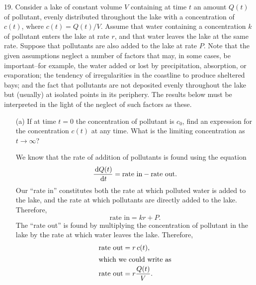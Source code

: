 \begin{ex}
  \item[19.]
    Consider a lake of constant volume $V$ containing at time $t$ an amount $Q(t)$ of pollutant,
    evenly distributed throughout the lake with a concentration of $c(t)$, where $c(t)=Q(t)/V$.
    Assume that water containing a concentration $k$ of pollutant enters the lake at rate $r$,
    and that water leaves the lake at the same rate.
    Suppose that pollutants are also added to the lake at rate $P$.
    Note that the given assumptions neglect a number of factors that may, in some cases, be important--for example,
    the water added or lost by precipitation, absorption, or evaporation;
    the tendency of irregularities in the coastline to produce sheltered bays;
    and the fact that pollutants are not deposited evenly throughout the lake but (usually) at isolated points in its periphery.
    The results below must be interpreted in the light of the neglect of such factors as these. \cite[p. 63]{boycede}
    \begin{enumerate}
      \item[(a)]
        If at time $t=0$ the concentration of pollutant is $c_0$, find an expression for the concentration $c(t)$ at any time.
        What is the limiting concentration as $t\to\infty$?
        \begin{sol}
          We know that the rate of addition of pollutants is found using the equation
          \begin{equation*}
            \frac{\,\mathrm{d} Q(t)}{\,\mathrm{d} t} = \text{rate in} - \text{rate out}.
          \end{equation*}
          Our ``rate in'' constitutes both the rate at which polluted water is added to the lake,
          and the rate at which pollutants are directly added to the lake.
          Therefore,
          \[ \text{rate in}=kr+P. \]
          The ``rate out'' is found by multiplying the concentration of pollutant in the lake by the rate at which water leaves the lake.
          Therefore,
          \begin{align*}
            \text{rate out} &=r\, c(t),\\
            \intertext{which we could write as}
            \text{rate out}&= r \frac{Q(t)}{V}.
          \end{align*}


\end{sol}
\end{enumerate}
\end{ex}

